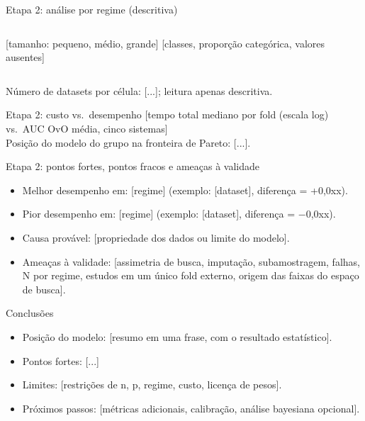 \documentclass[aspectratio=169,11pt]{beamer}
\begin{document}
\begin{frame}{Etapa 2: análise por regime (descritiva)}
    \begin{columns}[T,onlytextwidth]
        \centering
        [tamanho: pequeno, médio, grande]
        \centering
        [classes, proporção categórica, valores ausentes]
    \end{columns}
    \vspace{0.4em}
    \footnotesize Número de datasets por célula: [...]; leitura apenas descritiva.
\end{frame}

\begin{frame}{Etapa 2: custo vs.\ desempenho}
    \centering
    [tempo total mediano por fold (escala log) vs.\ AUC OvO média, cinco sistemas]
    \\[0.4em]
    \footnotesize Posição do modelo do grupo na fronteira de Pareto: [...].
\end{frame}

\begin{frame}{Etapa 2: pontos fortes, pontos fracos e ameaças à validade}
    \begin{itemize}
        \item Melhor desempenho em: [regime] (exemplo: [dataset], diferença = +0,0xx).
        \item Pior desempenho em: [regime] (exemplo: [dataset], diferença = $-$0,0xx).
        \item Causa provável: [propriedade dos dados ou limite do modelo].
        \item Ameaças à validade: [assimetria de busca, imputação, subamostragem, falhas, N por regime, estudos em um único fold externo, origem das faixas do espaço de busca].
    \end{itemize}
\end{frame}

\begin{frame}{Conclusões}
    \begin{itemize}
        \item Posição do modelo: [resumo em uma frase, com o resultado estatístico].
        \item Pontos fortes: [...]
        \item Limites: [restrições de n, p, regime, custo, licença de pesos].
        \item Próximos passos: [métricas adicionais, calibração, análise bayesiana opcional].
    \end{itemize}
\end{frame}
\end{document}
